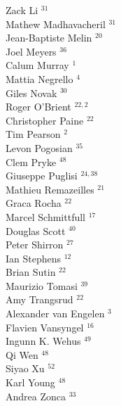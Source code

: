 \documentclass[PICOReport.tex]{subfiles}
\begin{document}
{\begin{multicols}{4}
Zack Li $^{31}$                         \\
Mathew Madhavacheril $^{31}$            \\
Jean-Baptiste Melin $^{20}$             \\
Joel Meyers $^{36}$                     \\
Calum Murray $^{1}$                    \\
Mattia Negrello $^{4}$                 \\
Giles Novak $^{30}$                     \\
Roger O'Brient $^{22,2}$                  \\
Christopher Paine $^{22}$               \\
Tim Pearson $^{2}$                     \\
Levon Pogosian $^{35}$                  \\
Clem Pryke $^{48}$                      \\
Giuseppe Puglisi $^{24,38}$                \\
Mathieu Remazeilles $^{21}$             \\
Graca Rocha $^{22}$                     \\
Marcel Schmittfull $^{17}$              \\
Douglas Scott $^{40}$                   \\
Peter Shirron $^{27}$                   \\
Ian Stephens $^{12}$                    \\
Brian Sutin $^{22}$                     \\
Maurizio Tomasi $^{39}$                 \\
Amy Trangsrud $^{22}$                   \\
Alexander van Engelen $^{3}$           \\
Flavien Vansyngel $^{16}$               \\
Ingunn K. Wehus $^{49}$                 \\
Qi Wen $^{48}$                          \\
Siyao Xu $^{52}$                        \\
Karl Young $^{48}$                      \\
Andrea Zonca $^{33}$
\end{multicols}
}
\end{document}
